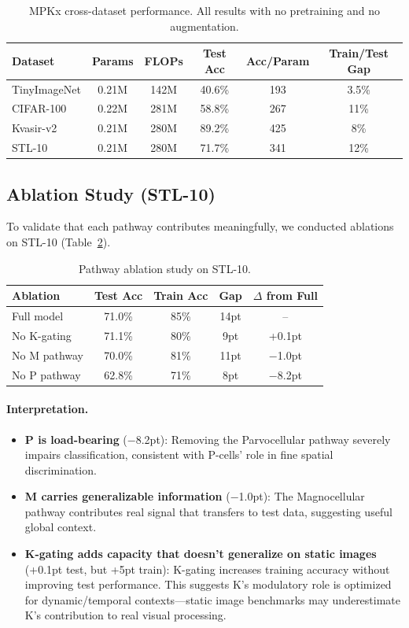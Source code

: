 \documentclass[11pt]{article}
\begin{document}
\begin{table}[h]
\centering
\begin{tabular}{lccccc}
\toprule
\textbf{Dataset} & \textbf{Params} & \textbf{FLOPs} & \textbf{Test Acc} & \textbf{Acc/Param} & \textbf{Train/Test Gap} \\
\midrule
TinyImageNet & 0.21M & 142M & 40.6\% & 193 & 3.5\% \\
CIFAR-100 & 0.22M & 281M & 58.8\% & 267 & 11\% \\
Kvasir-v2 & 0.21M & 280M & 89.2\% & 425 & 8\% \\
STL-10 & 0.21M & 280M & 71.7\% & 341 & 12\% \\
\bottomrule
\end{tabular}
\caption{MPKx cross-dataset performance. All results with no pretraining and no augmentation.}
\label{tab:summary}
\end{table}

\subsection{Ablation Study (STL-10)}

To validate that each pathway contributes meaningfully, we conducted ablations on STL-10 (Table~\ref{tab:ablation}).

\begin{table}[h]
\centering
\begin{tabular}{lcccc}
\toprule
\textbf{Ablation} & \textbf{Test Acc} & \textbf{Train Acc} & \textbf{Gap} & \textbf{$\Delta$ from Full} \\
\midrule
Full model & 71.0\% & 85\% & 14pt & -- \\
No K-gating & 71.1\% & 80\% & 9pt & +0.1pt \\
No M pathway & 70.0\% & 81\% & 11pt & $-$1.0pt \\
No P pathway & 62.8\% & 71\% & 8pt & $-$8.2pt \\
\bottomrule
\end{tabular}
\caption{Pathway ablation study on STL-10.}
\label{tab:ablation}
\end{table}

\paragraph{Interpretation.}
\begin{itemize}
    \item \textbf{P is load-bearing} ($-$8.2pt): Removing the Parvocellular pathway severely impairs classification, consistent with P-cells' role in fine spatial discrimination.
    \item \textbf{M carries generalizable information} ($-$1.0pt): The Magnocellular pathway contributes real signal that transfers to test data, suggesting useful global context.
    \item \textbf{K-gating adds capacity that doesn't generalize on static images} (+0.1pt test, but +5pt train): K-gating increases training accuracy without improving test performance. This suggests K's modulatory role is optimized for dynamic/temporal contexts---static image benchmarks may underestimate K's contribution to real visual processing.
\end{itemize}
\end{document}
